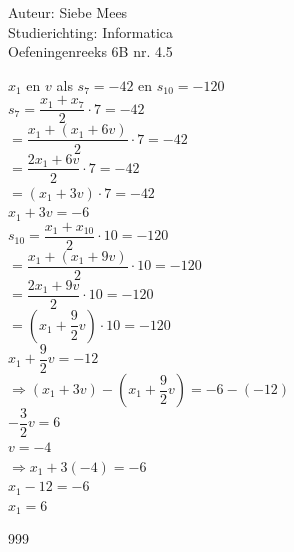 \documentclass[a4paper]{article}
\begin{document}
  
\noindent \large Auteur: Siebe Mees \\
\noindent \large Studierichting: Informatica\\
\noindent \large Oefeningenreeks 6B nr. 4.5\\

\medskip

\normalsize

$x_1 $ en $ v $ als $ s_7 = -42 $ en $ s_{10} = -120$\\

$s_7 = \dfrac{x_1 + x_7}{2} \cdot 7 = -42 $\\

$= \dfrac{x_1 + (x_1 + 6v)}{2} \cdot 7 = -42 $\\

$= \dfrac{2x_1 + 6v}{2} \cdot 7 = -42 $\\

$= (x_1 + 3v)\cdot 7 = -42 $\\

$x_1 + 3v = -6$\\

$s_{10} = \dfrac{x_1 + x_{10}}{2} \cdot 10 = -120 $\\

$= \dfrac{x_1 + (x_1 + 9v)}{2} \cdot 10 = -120 $\\

$= \dfrac{2x_1 + 9v}{2} \cdot 10 = -120 $\\

$= \left(x_1 + \dfrac{9}{2}v\right)\cdot 10 = -120 $\\

$ x_1 + \dfrac{9}{2}v = -12$\\

$ \Rightarrow (x_1 + 3v) - \left(x_1 + \dfrac{9}{2}v\right) = -6 - (-12)$\\

$- \dfrac{3}{2}v = 6$\\

$v = -4$\\

$\Rightarrow x_1 + 3(-4) = -6$\\

$x_1 - 12 = -6$\\

$x_1 = 6$\\

\begin{thebibliography}{999}
\end{thebibliography}
\end{document}
